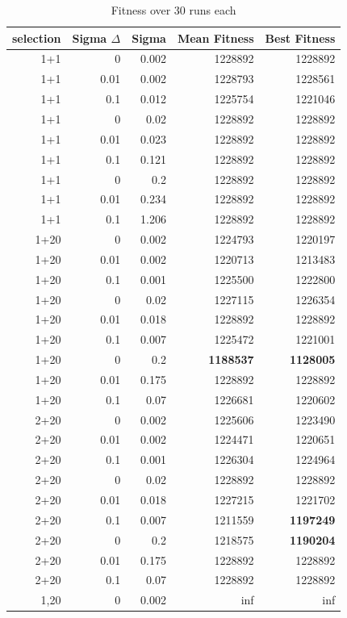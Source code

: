 \documentclass{scrartcl}
\begin{document}
\begin{table}[htbp]
\caption{Fitness over 30 runs each}
\begin{tabular}{r r r|r r }

selection & Sigma $\Delta$ & Sigma & Mean Fitness & Best Fitness \\ \hline
1+1 & 0 & 0.002 & 1228892 & 1228892 \\ 
1+1 & 0.01 & 0.002 & 1228793 & 1228561 \\ 
1+1 & 0.1 & 0.012 & 1225754 & 1221046 \\ 
1+1 & 0 & 0.02 & 1228892 & 1228892 \\ 
1+1 & 0.01 & 0.023 & 1228892 & 1228892 \\ 
1+1 & 0.1 & 0.121 & 1228892 & 1228892 \\ 
1+1 & 0 & 0.2 & 1228892 & 1228892 \\ 
1+1 & 0.01 & 0.234 & 1228892 & 1228892 \\ 
1+1 & 0.1 & 1.206 & 1228892 & 1228892 \\ 
1+20 & 0 & 0.002 & 1224793 & 1220197 \\ 
1+20 & 0.01 & 0.002 & 1220713 & 1213483 \\ 
1+20 & 0.1 & 0.001 & 1225500 & 1222800 \\ 
1+20 & 0 & 0.02 & 1227115 & 1226354 \\ 
1+20 & 0.01 & 0.018 & 1228892 & 1228892 \\ 
1+20 & 0.1 & 0.007 & 1225472 & 1221001 \\ 
1+20 & 0 & 0.2 & \textbf{1188537} & \textbf{1128005} \\ 
1+20 & 0.01 & 0.175 & 1228892 & 1228892 \\ 
1+20 & 0.1 & 0.07 & 1226681 & 1220602 \\ 
2+20 & 0 & 0.002 & 1225606 & 1223490 \\ 
2+20 & 0.01 & 0.002 & 1224471 & 1220651 \\ 
2+20 & 0.1 & 0.001 & 1226304 & 1224964 \\ 
2+20 & 0 & 0.02 & 1228892 & 1228892 \\ 
2+20 & 0.01 & 0.018 & 1227215 & 1221702 \\ 
2+20 & 0.1 & 0.007 & 1211559 & \textbf{1197249} \\ 
2+20 & 0 & 0.2 & 1218575 & \textbf{1190204} \\ 
2+20 & 0.01 & 0.175 & 1228892 & 1228892 \\ 
2+20 & 0.1 & 0.07 & 1228892 & 1228892 \\ 
1,20 & 0 & 0.002 & inf & inf \\ 

\end{tabular}
\end{table}
\end{document}
